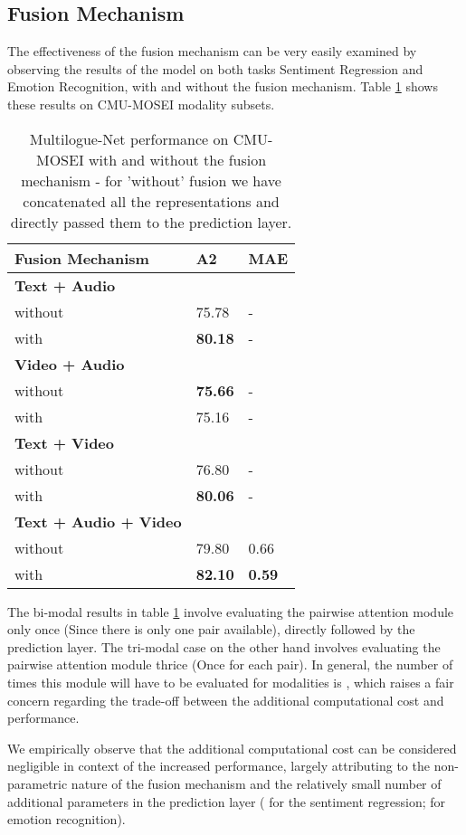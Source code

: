\documentclass[11pt,a4paper]{article}
\begin{document}
\subsection{Fusion Mechanism}
The effectiveness of the fusion mechanism can be very easily examined by observing the results of the model on both tasks  Sentiment Regression and Emotion Recognition, with and without the fusion mechanism. Table \ref{tab:fusion} shows these results on CMU-MOSEI modality subsets.

\begin{table}
\centering
\begin{tabular}{lll}
\hline
\textbf{Fusion Mechanism} & \textbf{A2} & \textbf{MAE}\\
\hline
\textbf{Text + Audio} \\
\hline
without & 75.78 & - \\
with & \textbf{80.18} & - \\
\hline
\textbf{Video + Audio} \\
\hline
without & \textbf{75.66} & - \\
with & 75.16 & - \\
\hline
\textbf{Text + Video} \\
\hline
without & 76.80 & - \\
with & \textbf{80.06} & - \\
\hline
\textbf{Text + Audio + Video} \\
\hline
without & 79.80 & 0.66 \\
with & \textbf{82.10} & \textbf{0.59} \\
\hline

\end{tabular}
\caption{\label{tab:fusion}
Multilogue-Net performance on CMU-MOSEI with and without the fusion mechanism - for 'without' fusion we have concatenated all the representations and directly passed them to the prediction layer.
}
\end{table}


The bi-modal results in table \ref{tab:fusion} involve evaluating the pairwise attention module only once (Since there is only one pair available), directly followed by the prediction layer. The tri-modal case on the other hand involves evaluating the pairwise attention module thrice (Once for each pair). In general, the number of times this module will have to be evaluated for  modalities is , which raises a fair concern regarding the trade-off between the additional computational cost and performance. 

We empirically observe that the additional computational cost can be considered negligible in context of the increased performance, largely attributing to the non-parametric nature of the fusion mechanism and the relatively small number of additional parameters in the prediction layer ( for the sentiment regression;  for emotion recognition).
\end{document}
